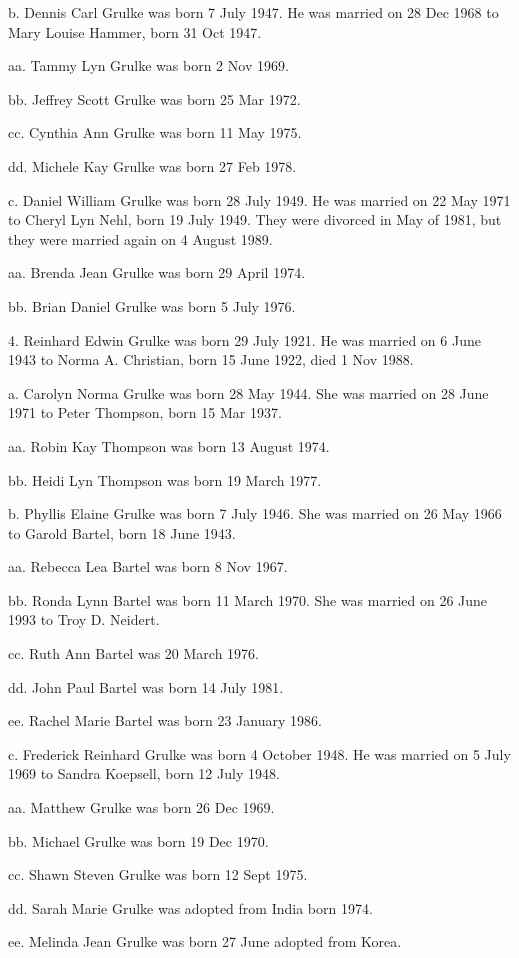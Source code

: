 \documentclass[a4paper]{article}
\begin{document}
b. Dennis Carl Grulke was born 7 July 1947.   He was married on 28 Dec 1968 to Mary Louise Hammer, born 31 Oct 1947.

aa. Tammy Lyn Grulke was born 2 Nov 1969.

bb. Jeffrey Scott Grulke was born 25 Mar 1972.

cc. Cynthia Ann Grulke was born 11 May 1975.

dd. Michele Kay Grulke was born 27 Feb 1978.

c. Daniel William Grulke was born 28 July 1949.  He was married on 22 May 1971 to Cheryl Lyn Nehl, born 19 July 1949.  They were divorced in May of 1981, but they were married again on 4 August 1989.  

aa. Brenda Jean Grulke was born 29 April 1974.

bb. Brian Daniel Grulke was born 5 July 1976.

4. Reinhard Edwin Grulke was born 29 July 1921.  He was married on 6 June 1943 to Norma A. Christian, born 15 June 1922, died 1 Nov 1988.

a. Carolyn Norma Grulke was born 28 May 1944.  She was married on 28 June 1971 to Peter Thompson, born 15 Mar 1937.

aa. Robin Kay Thompson was born 13 August 1974.

bb. Heidi Lyn Thompson was born 19 March 1977.

b. Phyllis Elaine Grulke was born 7 July 1946.  She was married on 26 May 1966 to Garold Bartel, born 18 June 1943.

aa. Rebecca Lea Bartel was born 8 Nov 1967.

bb. Ronda Lynn Bartel was born 11 March 1970.  She was married on 26 June 1993 to Troy D. Neidert.

cc. Ruth Ann Bartel was  20 March 1976.

dd. John Paul Bartel was born 14 July 1981.

ee. Rachel Marie Bartel was born 23 January 1986.

c. Frederick Reinhard Grulke was born 4 October 1948.  He was married on 5 July 1969 to Sandra Koepsell, born 12 July 1948.

aa. Matthew Grulke was born 26 Dec 1969.

bb. Michael Grulke was born 19 Dec 1970.

cc. Shawn Steven Grulke was born 12 Sept 1975.

dd. Sarah Marie Grulke was adopted from India born 1974.

ee. Melinda Jean Grulke was born 27 June adopted from Korea.
\end{document}
